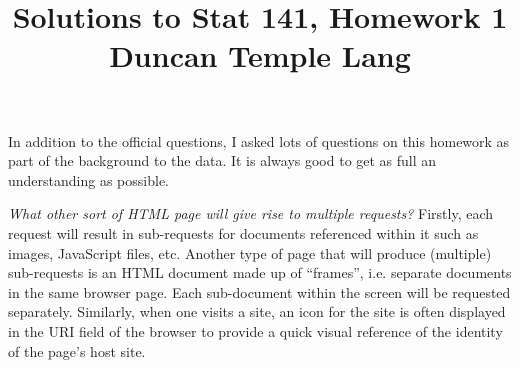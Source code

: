 \documentclass[10pt]{article}
\title{Solutions to Stat 141, Homework 1\\
Duncan Temple Lang}
\begin{document}
\maketitle

In addition to the official questions, 
I asked lots of questions on this homework
as part of the background to the data.
It is always good to get as full an understanding
as possible.

\textit{ What other sort of HTML page will give rise to multiple
  requests?} Firstly, each request will result in sub-requests for
documents referenced within it such as images, JavaScript files, etc.
Another type of page that will produce (multiple) sub-requests is an
HTML document made up of ``frames'', i.e.  separate documents in the
same browser page.  Each sub-document within the screen will be
requested separately.  Similarly, when one visits a site, an icon for
the site is often displayed in the URI field of the browser to provide
a quick visual reference of the identity of the page's host site.
\end{document}
